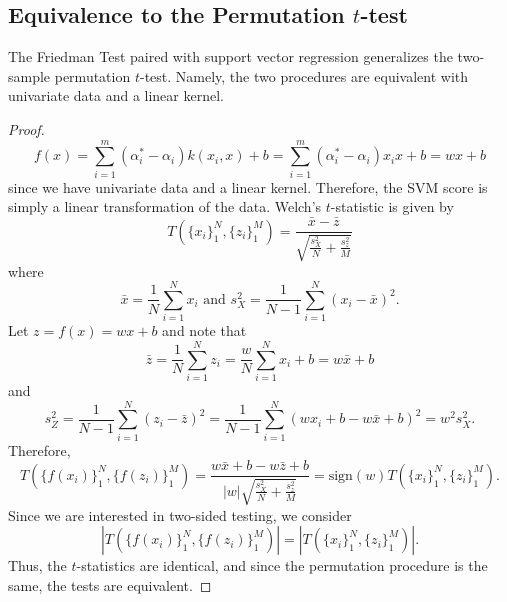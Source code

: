 \subsection{Equivalence to the Permutation $t$-test}
\begin{theorem}
  \label{friedman_equiv}
  The Friedman Test paired with support vector regression generalizes
  the two-sample permutation $t$-test. Namely, the two procedures are
  equivalent with univariate data and a linear kernel.
\end{theorem}

\begin{proof}
  \begin{equation*}
    f(x)=\sum_{i=1}^m(\alpha_i^*-\alpha_i)k(x_i,x)+b =
    \sum_{i=1}^m(\alpha_i^*-\alpha_i)x_ix+b = wx+b
  \end{equation*}
  since we have univariate data and a linear kernel.
  Therefore, the SVM score is simply a linear transformation of the
  data.  Welch's $t$-statistic is given by
  \begin{equation*}
    T(\{x_i\}_1^N,\{z_i\}_1^M) = \frac{\bar{x}-\bar{z}}{\sqrt{\frac{s_X^2}{N}+\frac{s_z^2}{M}}}
  \end{equation*}
  where 
  \begin{equation*}
    \bar{x}=\frac{1}{N}\sum_{i=1}^N x_i \text{ and }
    s_X^2= \frac{1}{N-1}\sum_{i=1}^N(x_i-\bar{x})^2.
  \end{equation*}
  Let $z=f(x)=wx+b$ and note that 
  \begin{equation*}
    \bar{z}=\frac{1}{N}\sum_{i=1}^N z_i = \frac{w}{N}\sum_{i=1}^N x_i
    + b = w\bar{x}+b
  \end{equation*}
  and 
  \begin{equation*}
    s_Z^2= \frac{1}{N-1}\sum_{i=1}^N(z_i-\bar{z})^2= \frac{1}{N-1}\sum_{i=1}^N(wx_i+b-w\bar{x}+b)^2=w^2s_X^2.
  \end{equation*}
  Therefore, 
  \begin{equation*}
    T(\{f(x_i)\}_1^N,\{f(z_i)\}_1^M) =
    \frac{w\bar{x}+b-w\bar{z}+b}{|w|\sqrt{\frac{s_X^2}{N}+\frac{s_z^2}{M}}}
    = \text{sign}(w) T(\{x_i\}_1^N,\{z_i\}_1^M).
  \end{equation*}
  Since we are interested in two-sided testing, we consider
  \begin{equation*}
    |T(\{f(x_i)\}_1^N,\{f(z_i)\}_1^M)| = |T(\{x_i\}_1^N,\{z_i\}_1^M)|.
  \end{equation*}
  Thus, the $t$-statistics are identical, and since the permutation
  procedure is the same, the tests are equivalent.
\end{proof}

